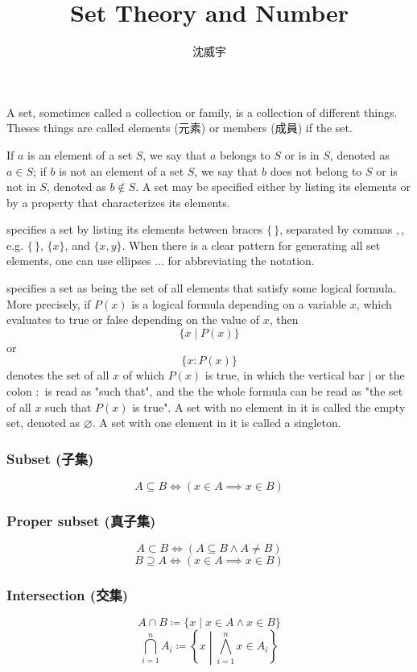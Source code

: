 \documentclass[a4paper,12pt]{report}
\begin{document}
\title{Set Theory and Number}
\author{沈威宇}
\date{\temtoday}
\titletocdoc
{}
A set, sometimes called a collection or family, is a collection of different things. Theses things are called elements (元素) or members (成員) if the set.

If $a$ is an element of a set $S$, we say that $a$ belongs to $S$ or is in $S$, denoted as $a\in S$; if $b$ is not an element of a set $S$, we say that $b$ does not belong to $S$ or is not in $S$, denoted as $b\notin S$.
A set may be specified either by listing its elements or by a property that characterizes its elements.

 specifies a set by listing its elements between braces $\{\,\}$, separated by commas $,$, e.g. $\{\,\}$, $\{x\}$, and $\{x,y\}$. When there is a clear pattern for generating all set elements, one can use ellipses $\ldots$ for abbreviating the notation.

 specifies a set as being the set of all elements that satisfy some logical formula. More precisely, if $P(x)$ is a logical formula depending on a variable ⁠$x$, which evaluates to true or false depending on the value of $x$, then
\[\{x\mid P(x)\}\]
or
\[\{x\colon P(x)\}\]
denotes the set of all $x$ of which $P(x)$ is true, in which the vertical bar $\mid$ or the colon $\colon$ is read as "such that", and the the whole formula can be read as "the set of all $x$ such that $P(x)$ is true".
A set with no element in it is called the empty set, denoted as $\varnothing$. A set with one element in it is called a singleton.
\subsubsection{Subset (子集)}
\[A\subseteq B\iff (x\in A\implies x\in B)\]
\subsubsection{Proper subset (真子集)}
\[A\subset B\iff (A\subseteq B\land A\neq B)\]
\[B\supseteq A\iff (x\in A\implies x\in B)\]
\subsubsection{Intersection (交集)}
\[A\cap B\coloneq\{x\mid x\in A \land x\in B\}\]
\[\bigcap_{i=1}^n A_i\coloneq\left\{x\middle | \bigwedge_{i=1}^n x\in A_i\right\}\]
\end{document}
